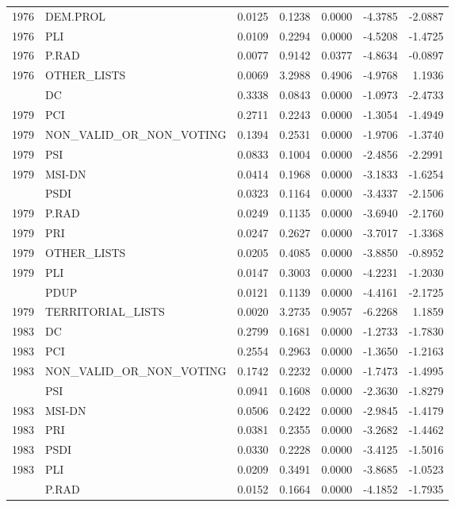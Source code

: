 \begin{longtable}[t]{rlrrrrr}
1976 & DEM.PROL & 0.0125 & 0.1238 & 0.0000 & -4.3785 & -2.0887\\
1976 & PLI & 0.0109 & 0.2294 & 0.0000 & -4.5208 & -1.4725\\
1976 & P.RAD & 0.0077 & 0.9142 & 0.0377 & -4.8634 & -0.0897\\
1976 & OTHER\_LISTS & 0.0069 & 3.2988 & 0.4906 & -4.9768 & 1.1936\\
\addlinespace
1979 & DC & 0.3338 & 0.0843 & 0.0000 & -1.0973 & -2.4733\\
1979 & PCI & 0.2711 & 0.2243 & 0.0000 & -1.3054 & -1.4949\\
1979 & NON\_VALID\_OR\_NON\_VOTING & 0.1394 & 0.2531 & 0.0000 & -1.9706 & -1.3740\\
1979 & PSI & 0.0833 & 0.1004 & 0.0000 & -2.4856 & -2.2991\\
1979 & MSI-DN & 0.0414 & 0.1968 & 0.0000 & -3.1833 & -1.6254\\
\addlinespace
1979 & PSDI & 0.0323 & 0.1164 & 0.0000 & -3.4337 & -2.1506\\
1979 & P.RAD & 0.0249 & 0.1135 & 0.0000 & -3.6940 & -2.1760\\
1979 & PRI & 0.0247 & 0.2627 & 0.0000 & -3.7017 & -1.3368\\
1979 & OTHER\_LISTS & 0.0205 & 0.4085 & 0.0000 & -3.8850 & -0.8952\\
1979 & PLI & 0.0147 & 0.3003 & 0.0000 & -4.2231 & -1.2030\\
\addlinespace
1979 & PDUP & 0.0121 & 0.1139 & 0.0000 & -4.4161 & -2.1725\\
1979 & TERRITORIAL\_LISTS & 0.0020 & 3.2735 & 0.9057 & -6.2268 & 1.1859\\
1983 & DC & 0.2799 & 0.1681 & 0.0000 & -1.2733 & -1.7830\\
1983 & PCI & 0.2554 & 0.2963 & 0.0000 & -1.3650 & -1.2163\\
1983 & NON\_VALID\_OR\_NON\_VOTING & 0.1742 & 0.2232 & 0.0000 & -1.7473 & -1.4995\\
\addlinespace
1983 & PSI & 0.0941 & 0.1608 & 0.0000 & -2.3630 & -1.8279\\
1983 & MSI-DN & 0.0506 & 0.2422 & 0.0000 & -2.9845 & -1.4179\\
1983 & PRI & 0.0381 & 0.2355 & 0.0000 & -3.2682 & -1.4462\\
1983 & PSDI & 0.0330 & 0.2228 & 0.0000 & -3.4125 & -1.5016\\
1983 & PLI & 0.0209 & 0.3491 & 0.0000 & -3.8685 & -1.0523\\
\addlinespace
1983 & P.RAD & 0.0152 & 0.1664 & 0.0000 & -4.1852 & -1.7935\\

\end{longtable}
